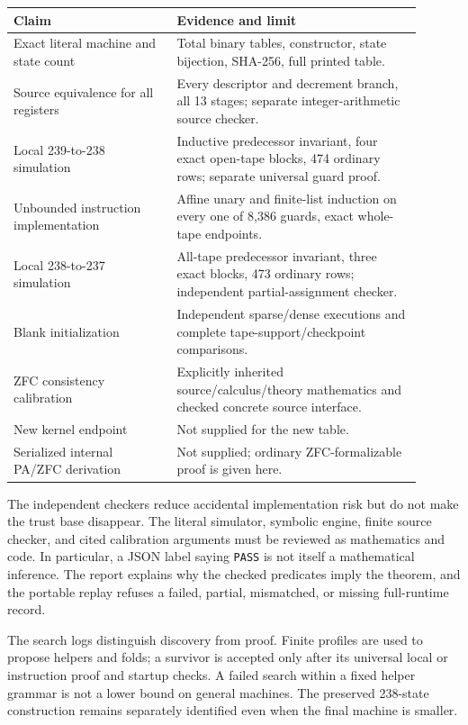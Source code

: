 \documentclass[11pt,letterpaper]{article}
\theoremstyle{definition}\newtheorem{definition}[theorem]{Definition}
\begin{document}
\begin{center}\small
\begin{tabular}{p{0.36\linewidth}p{0.54\linewidth}}
\toprule
Claim & Evidence and limit\\\midrule
Exact literal machine and state count & Total binary tables, constructor,
state bijection, SHA-256, full printed table.\\[3pt]
Source equivalence for all registers & Every descriptor and decrement
branch, all 13 stages; separate integer-arithmetic source checker.\\[3pt]
Local 239-to-238 simulation & Inductive predecessor invariant, four exact
open-tape blocks, 474 ordinary rows; separate universal guard proof.\\[3pt]
Unbounded instruction implementation & Affine unary and finite-list
induction on every one of 8,386 guards, exact whole-tape endpoints.\\[3pt]
Local 238-to-237 simulation & All-tape predecessor invariant, three exact
blocks, 473 ordinary rows; independent partial-assignment checker.\\[3pt]
Blank initialization & Independent sparse/dense executions and complete
tape-support/checkpoint comparisons.\\[3pt]
ZFC consistency calibration & Explicitly inherited source/calculus/theory
mathematics and checked concrete source interface.\\[3pt]
New kernel endpoint & Not supplied for the new table.\\[3pt]
Serialized internal PA/ZFC derivation & Not supplied; ordinary
ZFC-formalizable proof is given here.\\
\bottomrule
\end{tabular}
\end{center}

The independent checkers reduce accidental implementation risk but do
not make the trust base disappear.  The literal simulator, symbolic
engine, finite source checker, and cited calibration arguments must be
reviewed as mathematics and code.  In particular, a JSON label saying
\texttt{PASS} is not itself a mathematical inference.  The report explains
why the checked predicates imply the theorem, and the portable replay
refuses a failed, partial, mismatched, or missing full-runtime record.

The search logs distinguish discovery from proof.  Finite profiles are
used to propose helpers and folds; a survivor is accepted only after its
universal local or instruction proof and startup checks.  A failed search
within a fixed helper grammar is not a lower bound on general machines.
The preserved 238-state construction remains separately identified even
when the final machine is smaller.
\end{document}
